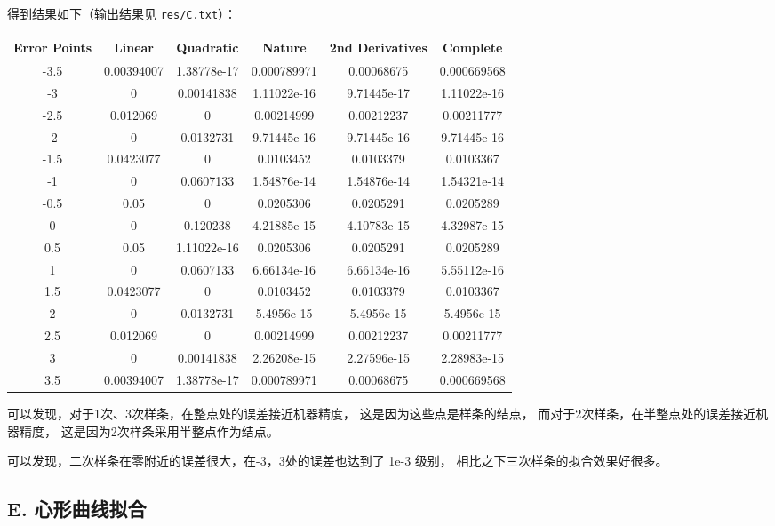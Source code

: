 \documentclass[lang=cn,a4paper,newtx,bibend=bibtex]{elegantpaper}
\begin{document}
得到结果如下（输出结果见 \lstinline{res/C.txt}）：

\begin{table}[h]
  \centering
  \begin{tabular}{|c|c|c|c|c|c|}
  \hline
  \textbf{Error Points} & \textbf{Linear} & \textbf{Quadratic} & \textbf{Nature} & \textbf{2nd Derivatives} & \textbf{Complete} \\
  \hline
  -3.5 & 0.00394007 & 1.38778e-17 & 0.000789971 & 0.00068675 & 0.000669568 \\
  -3 & 0 & 0.00141838 & 1.11022e-16 & 9.71445e-17 & 1.11022e-16 \\
  -2.5 & 0.012069 & 0 & 0.00214999 & 0.00212237 & 0.00211777 \\
  -2 & 0 & 0.0132731 & 9.71445e-16 & 9.71445e-16 & 9.71445e-16 \\
  -1.5 & 0.0423077 & 0 & 0.0103452 & 0.0103379 & 0.0103367 \\
  -1 & 0 & 0.0607133 & 1.54876e-14 & 1.54876e-14 & 1.54321e-14 \\
  -0.5 & 0.05 & 0 & 0.0205306 & 0.0205291 & 0.0205289 \\
  0 & 0 & 0.120238 & 4.21885e-15 & 4.10783e-15 & 4.32987e-15 \\
  0.5 & 0.05 & 1.11022e-16 & 0.0205306 & 0.0205291 & 0.0205289 \\
  1 & 0 & 0.0607133 & 6.66134e-16 & 6.66134e-16 & 5.55112e-16 \\
  1.5 & 0.0423077 & 0 & 0.0103452 & 0.0103379 & 0.0103367 \\
  2 & 0 & 0.0132731 & 5.4956e-15 & 5.4956e-15 & 5.4956e-15 \\
  2.5 & 0.012069 & 0 & 0.00214999 & 0.00212237 & 0.00211777 \\
  3 & 0 & 0.00141838 & 2.26208e-15 & 2.27596e-15 & 2.28983e-15 \\
  3.5 & 0.00394007 & 1.38778e-17 & 0.000789971 & 0.00068675 & 0.000669568 \\
  \hline
  \end{tabular}
  \end{table}

  可以发现，对于1次、3次样条，在整点处的误差接近机器精度，
  这是因为这些点是样条的结点，
  而对于2次样条，在半整点处的误差接近机器精度，
  这是因为2次样条采用半整点作为结点。

  可以发现，二次样条在零附近的误差很大，在-3，3处的误差也达到了 1e-3 级别，
  相比之下三次样条的拟合效果好很多。


\subsection{E. 心形曲线拟合}
\end{document}
